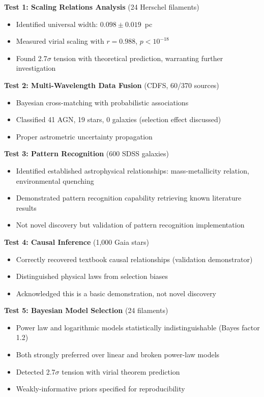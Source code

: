 \documentclass[usenatbib]{rasti}
\begin{document}
\textbf{Test 1: Scaling Relations Analysis} (24 Herschel filaments)
\begin{itemize}
\item Identified universal width: $0.098 \pm 0.019$~pc
\item Measured virial scaling with $r = 0.988$, $p < 10^{-18}$
\item Found 2.7$\sigma$ tension with theoretical prediction, warranting further investigation
\end{itemize}

\textbf{Test 2: Multi-Wavelength Data Fusion} (CDFS, 60/370 sources)
\begin{itemize}
\item Bayesian cross-matching with probabilistic associations
\item Classified 41 AGN, 19 stars, 0 galaxies (selection effect discussed)
\item Proper astrometric uncertainty propagation
\end{itemize}

\textbf{Test 3: Pattern Recognition} (600 SDSS galaxies)
\begin{itemize}
\item Identified established astrophysical relationships: mass-metallicity relation, environmental quenching
\item Demonstrated pattern recognition capability retrieving known literature results
\item Not novel discovery but validation of pattern recognition implementation
\end{itemize}

\textbf{Test 4: Causal Inference} (1,000 Gaia stars)
\begin{itemize}
\item Correctly recovered textbook causal relationships (validation demonstrator)
\item Distinguished physical laws from selection biases
\item Acknowledged this is a basic demonstration, not novel discovery
\end{itemize}

\textbf{Test 5: Bayesian Model Selection} (24 filaments)
\begin{itemize}
\item Power law and logarithmic models statistically indistinguishable (Bayes factor 1.2)
\item Both strongly preferred over linear and broken power-law models
\item Detected 2.7$\sigma$ tension with virial theorem prediction
\item Weakly-informative priors specified for reproducibility
\end{itemize}
\end{document}
